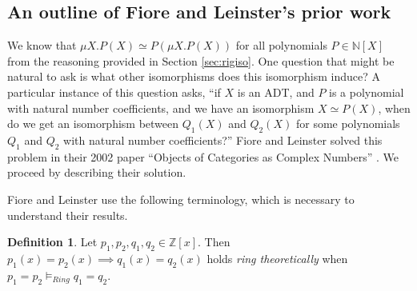 \documentclass{msthesis}
\theoremstyle{definition}
\newtheorem{definition}[theorem]{Definition}
\newcommand{\ints}{\mathbb{Z}}
\newcommand{\nat}{\mathbb{N}}
\begin{document}

\subsection{An outline of Fiore and Leinster's prior work}

We know that $\mu X.P(X) \simeq P(\mu X. P(X))$ for all polynomials $P \in \nat[X]$ from the reasoning provided in Section \ref{sec:rigiso}.  One question that might be natural to ask is what other isomorphisms does this isomorphism induce?  A particular instance of this question asks, ``if $X$ is an ADT, and $P$ is a polynomial with natural number coefficients, and we have an isomorphism $X \simeq P(X)$, when do we get an isomorphism between $Q_1(X)$ and $Q_2(X)$ for some polynomials $Q_1$ and $Q_2$ with natural number coefficients?''  Fiore and Leinster solved this problem in their 2002 paper ``Objects of Categories as Complex Numbers'' \cite{Fiore2005}.  We proceed by describing their solution.

Fiore and Leinster use the following terminology, which is necessary to understand their results.

\begin{definition}\label{def:ringtheoretic}
Let $p_1, p_2, q_1, q_2 \in \ints[x]$.  Then $p_1(x) = p_2(x) \implies q_1(x) = q_2(x)$ holds \textit{ring theoretically} when $p_1 = p_2 \models_{Ring} q_1 = q_2$.
\end{definition}
\end{document}
